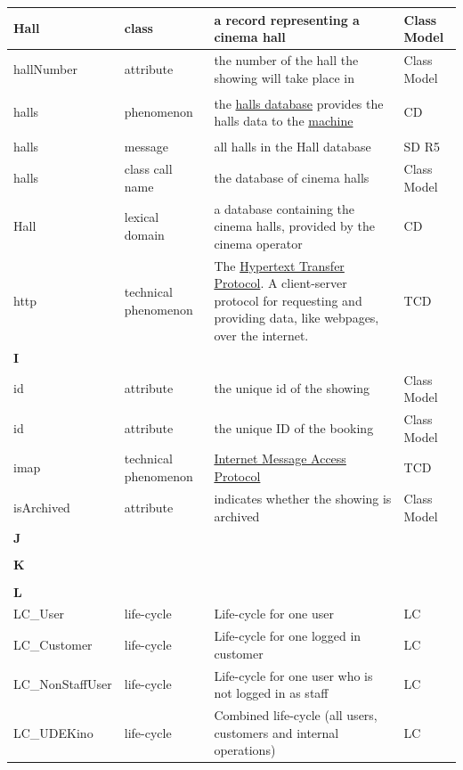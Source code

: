 \documentclass[a4paper,10pt,titlepage,bibtotoc,bibtotocnumbered]{scrreprt}
\begin{document}
\begin{longtable}{|p{4cm}|p{3cm}|p{5cm}|l|}
\hline
Hall & class & a record representing a cinema hall & Class Model\\
\hline
hallNumber & attribute & the number of the hall the showing will take place in & Class Model\\
\hline
\hypertarget{glossary:halls}{halls} & phenomenon & the \hyperlink{glossary:Hall}{halls database} provides the halls data to the \hyperlink{glossary:UDEKino}{machine} & CD\\
\hline
halls & message & all halls in the Hall database & SD R5\\
\hline
halls & class call name & the database of cinema halls & Class Model\\
\hline
\hypertarget{glossary:Hall}{Hall} & lexical domain & a database containing the cinema halls, provided by the cinema operator & CD\\
\hline
http & technical phenomenon & The \href{https://datatracker.ietf.org/doc/html/rfc9112}{Hypertext Transfer Protocol}. A client-server protocol for requesting and providing data, like webpages, over the internet. & TCD\\
\hline
\multicolumn{4}{|l|}{\textbf{I}}\\
\hline
id & attribute & the unique id of the showing & Class Model\\
\hline
id & attribute & the unique ID of the booking & Class Model\\
\hline
imap & technical phenomenon & \href{https://tools.ietf.org/html/rfc3501}{Internet Message Access Protocol} & TCD\\
\hline
isArchived & attribute & indicates whether the showing is archived & Class Model\\
\hline
\multicolumn{4}{|l|}{\textbf{J}}\\
\hline
&  &  & \\
\hline
\multicolumn{4}{|l|}{\textbf{K}}\\
\hline
&  &  & \\
\hline
\multicolumn{4}{|l|}{\textbf{L}}\\
\hline
LC\_{User} & life-cycle & Life-cycle for one user & LC\\
\hline
LC\_{Customer} & life-cycle & Life-cycle for one logged in customer & LC\\
\hline
LC\_{NonStaffUser} & life-cycle & Life-cycle for one user who is not logged in as staff & LC\\
\hline
LC\_{UDEKino} & life-cycle & Combined life-cycle (all users, customers and internal operations) & LC\\

\end{longtable}
\end{document}
